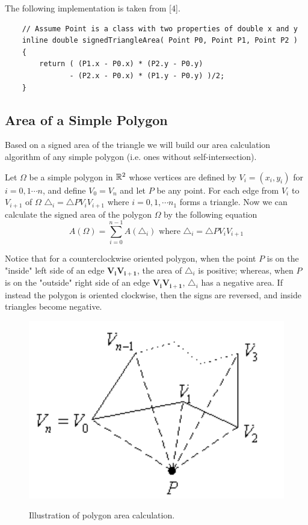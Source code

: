 \documentclass[12pt]{article}
\begin{document}
The following implementation is taken from [4].
\begin{lstlisting}
    // Assume Point is a class with two properties of double x and y
    inline double signedTriangleArea( Point P0, Point P1, Point P2 )
    {
        return ( (P1.x - P0.x) * (P2.y - P0.y)
               - (P2.x - P0.x) * (P1.y - P0.y) )/2;
    }
\end{lstlisting}

\subsection{Area of a Simple Polygon}
Based on a signed area of the triangle we will build our area calculation algorithm of any simple polygon (i.e. ones without self-intersection).

Let $\Omega$ be a simple polygon in $\mathbb{R}^2$ whose vertices are defined by $V_i = (x_i, y_i)$
for $i = 0,1 \cdots n$, and define $V_0 = V_n$ and let $P$ be any point. 
For each edge from $V_i$ to $V_{i+1}$ of $\Omega$ $\triangle_i = \triangle PV_iV_{i+1}$ where
$i = 0,1, \cdots n_1$ forms a triangle. Now we can calculate the signed area of the polygon $\Omega$
by the following equation
$$ A(\Omega) = \sum_{i=0}^{n-1} A(\triangle_i) \text{ where } \triangle_i = \triangle PV_iV_{i+1}$$

Notice that for a counterclockwise oriented polygon, when the point $P$ is on 
the "inside" left side of an edge $\pmb{V_iV_{i+1}}$, the area of $\triangle_i$ is positive; 
whereas, when $P$ is on the "outside" right side of an edge $\pmb{V_iV_{i+1}}$,  $\triangle_i$
has a negative area. If instead the polygon is oriented clockwise, then the 
signs are reversed, and inside triangles become negative.

\begin{center}
  \begin{figure}[h]
    \centering
    \includegraphics[width=\linewidth/2]{figures/fig26.png}
    \label{fig:8}
    \caption{Illustration of polygon area calculation.}
  \end{figure}
\end{center}
\end{document}
